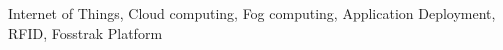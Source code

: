 
\begin{IEEEkeywords}
Internet of Things, Cloud computing, Fog computing, Application Deployment, RFID, Fosstrak Platform
\end{IEEEkeywords}
